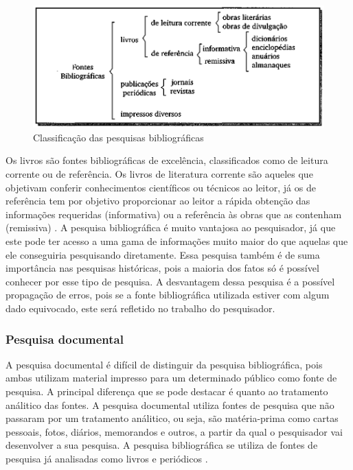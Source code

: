 \begin{figure}[h]
\centering
\includegraphics[keepaspectratio=true,scale=0.3]{figuras/tiposDePesquisaBibliografica.png}
\caption{Classificação das pesquisas bibliográficas \cite{ac2002elaborar}}
\label{tiposDePesquisaBibliografica}
\end{figure}
	
	Os livros são fontes bibliográficas de excelência, classificados como de leitura corrente ou de referência. Os livros de literatura corrente são aqueles que objetivam conferir conhecimentos científicos ou técnicos ao leitor, já os de referência tem por objetivo proporcionar ao leitor a rápida obtenção das informações requeridas (informativa) ou a referência às obras que as contenham (remissiva) \cite{ac2002elaborar}.  
A pesquisa bibliográfica é muito vantajosa ao pesquisador, já que este pode ter acesso a uma gama de informações muito maior do que aquelas que ele conseguiria pesquisando diretamente. Essa pesquisa também é de suma importância nas pesquisas históricas, pois a maioria dos fatos só é possível conhecer por esse tipo de pesquisa.
A desvantagem dessa pesquisa é a possível propagação de erros, pois se a fonte bibliográfica utilizada estiver com algum dado equivocado, este será refletido no trabalho do pesquisador.	
\subsubsection{Pesquisa documental}
	A pesquisa documental é difícil de distinguir da pesquisa bibliográfica, pois ambas utilizam material impresso para um determinado público como fonte de pesquisa. A principal diferença que se pode destacar é quanto ao tratamento análitico das fontes. A pesquisa documental utiliza fontes de pesquisa que não passaram por um tratamento análitico, ou seja, são matéria-prima como cartas pessoais, fotos, diários, memorandos e outros, a partir da qual o pesquisador vai desenvolver a sua pesquisa. A pesquisa bibliográfica se utiliza de fontes de pesquisa já analisadas como livros e periódicos \cite{ac2002elaborar}.
